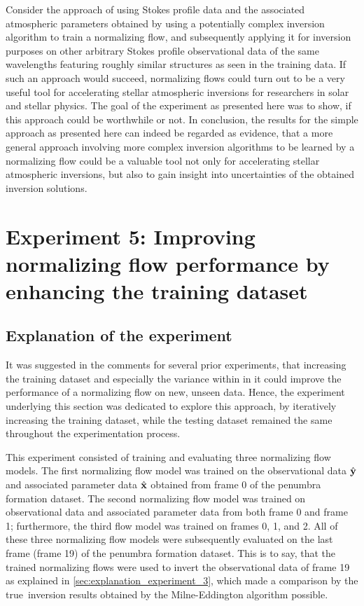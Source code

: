 \documentclass[a4paper,12pt]{report}
\begin{document}
Consider the approach of using Stokes profile data and the associated atmospheric parameters obtained by using a potentially complex inversion algorithm to train a normalizing flow, and subsequently applying it for inversion purposes on other arbitrary Stokes profile observational data of the same wavelengths featuring roughly similar structures as seen in the training data. If such an approach would succeed, normalizing flows could turn out to be a very useful tool for accelerating stellar atmospheric inversions for researchers in solar and stellar physics. The goal of the experiment as presented here was to show, if this approach could be worthwhile or not. In conclusion, the results for the simple approach as presented here can indeed be regarded as evidence, that a more general approach involving more complex inversion algorithms to be learned by a normalizing flow could be a valuable tool not only for accelerating stellar atmospheric inversions, but also to gain insight into uncertainties of the obtained inversion solutions.

\FloatBarrier
\section{Experiment 5: Improving normalizing flow performance by enhancing the training dataset}
\subsection{Explanation of the experiment}
It was suggested in the comments for several prior experiments, that increasing the training dataset and especially the variance within in it could improve the performance of a normalizing flow on new, unseen data. Hence, the experiment underlying this section was dedicated to explore this approach, by iteratively increasing the training dataset, while the testing dataset remained the same throughout the experimentation process.

This experiment consisted of training and evaluating three normalizing flow models. The first normalizing flow model was trained on the observational data $\hat{\boldsymbol{\mathbf{y}}}$ and associated parameter data $\hat{\boldsymbol{\mathbf{x}}}$ obtained from frame 0 of the penumbra formation dataset. The second normalizing flow model was trained on observational data and associated parameter data from both frame 0 and frame 1; furthermore, the third flow model was trained on frames 0, 1, and 2. All of these three normalizing flow models were subsequently evaluated on the last frame (frame 19) of the penumbra formation dataset. This is to say, that the trained normalizing flows were used to invert the observational data of frame 19 as explained in \cref{sec:explanation_experiment_3}, which made a comparison by the \flqq true\frqq\ inversion results obtained by the Milne-Eddington algorithm possible.
\end{document}
